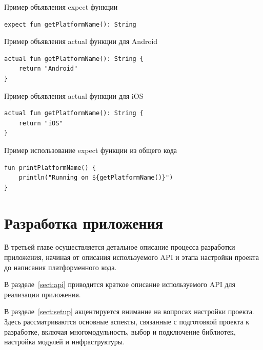 \documentclass[14pt, russian]{scrartcl}
\begin{document}
\begin{listing}[!htb]
\caption{Пример объявления expect функции}
\label{lst:expect_example}
\begin{verbatim}
expect fun getPlatformName(): String
\end{verbatim}
\end{listing}

\begin{listing}[!htb]
\caption{Пример объявления actual функции для Android}
\label{lst:actual_android}
\begin{verbatim}
actual fun getPlatformName(): String {
    return "Android"
}
\end{verbatim}
\end{listing}

\begin{listing}[!htb]
\caption{Пример объявления actual функции для iOS}
\label{lst:actual_ios}
\begin{verbatim}
actual fun getPlatformName(): String {
    return "iOS"
}
\end{verbatim}
\end{listing}

\begin{listing}[!htb]
\caption{Пример использование expect функции из общего кода}
\label{lst:expect_usage}
\begin{verbatim}
fun printPlatformName() {
    println("Running on ${getPlatformName()}")
}
\end{verbatim}
\end{listing}

\section{Разработка приложения}\label{sect:development}

В третьей главе осуществляется детальное описание процесса разработки приложения, начиная от описания используемого API и этапа настройки проекта до написания платформенного кода.

В разделе~\ref{sect:api} приводится краткое описание используемого API для реализации приложения.

В разделе~\ref{sect:setup} акцентируется внимание на вопросах настройки проекта. Здесь рассматриваются основные аспекты, связанные с подготовкой проекта к разработке, включая многомодульность, выбор и подключение библиотек, настройка модулей и инфраструктуры.
\end{document}

